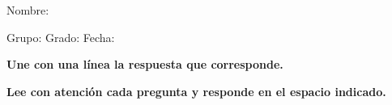 \documentclass[10pt,addpoints]{exam}
\begin{document}
%

Nombre:\enspace\hrulefill

\vspace{5mm}

Grupo:\enspace\hrulefill
\enspace{}Grado:\enspace\hrulefill
\enspace{}Fecha:\enspace\hrulefill

\begin{questions}

\begin{EnvFullwidth}
  \sffamily\textbf{Une con una línea la respuesta que corresponde.}
\end{EnvFullwidth}



\begin{EnvFullwidth}
  \sffamily\textbf{Lee con atención cada pregunta y responde en
  el espacio indicado. }
\end{EnvFullwidth}






\end{questions}
\end{document}
